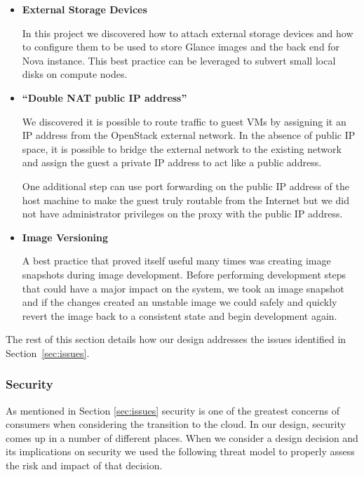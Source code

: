 \begin{itemize}
  \item \textbf{External Storage Devices}

     In this project we discovered how to attach external storage
     devices and how to configure them to be used to store Glance images
     and the back end for Nova instance. This best practice can be
     leveraged to subvert small local disks on compute nodes.

  \item \textbf{``Double NAT public IP address'' }

     We discovered it is possible to route traffic to guest VMs by
     assigning it an IP address from the OpenStack external network. In
     the absence of public IP space, it is possible to bridge the external 
     network to the existing network and assign the guest a private IP 
     address to act like a public address. 

     One additional step can use port forwarding on the public IP
     address of the host machine to make the guest truly routable from
     the Internet but we did not have administrator privileges on the 
     proxy with the public IP address.

  \item \textbf{Image Versioning}

     A best practice that proved itself useful many times was creating 
     image snapshots during image development. Before performing 
     development steps that could have a major impact on the system, we
     took an image snapshot and if the changes created an unstable image
     we could safely and quickly revert the image back to a consistent
     state and begin development again.

\end{itemize}


The rest of this section details how our design addresses the issues
identified in Section~\ref{sec:issues}.

\subsubsection{Security}
\label{sec:security}

As mentioned in Section	\ref{sec:issues} security is one of the greatest
concerns of consumers when considering the transition to the cloud. In our
design, security comes up in a number of different places. When we
consider a design decision and its implications on security we used
the following threat model to properly assess the risk and impact of that
decision.\\

